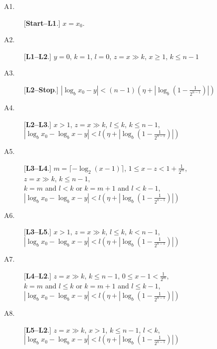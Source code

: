 \documentclass[a4paper,12pt]{article}
\begin{document}
\begin{description}
\item[A1.]
[\textbf{Start--L1}.] $x = x_0$.
\item[A2.]
[\textbf{L1--L2}.] $y=0$, $k=1$, $l=0$, $z = x \gg k$, $x \ge 1$, $k \le n-1$
\item[A3.]
[\textbf{L2--Stop}.] 
$|\log_bx_0-y| < (n-1)\left(\eta + 
\left|\log_b\left(1 - \frac{1}{2^{n-1}}\right)\right|\right)$
\item[A4.]
[\textbf{L2--L3}.]
$x>1$, $z = x \gg k$, $l \le k$, $k \le n-1$,\\
$|\log_bx_0 - \log_b x - y| < l\left(\eta+
\left|\log_b\left(1 - \frac{1}{2^{n-1}}\right)\right|\right)$
\item[A5.]
[\textbf{L3--L4}.]
$m = \lceil-\log_2(x-1)\rceil$, $1 \le x-z < 1+\frac{1}{2^m}$,\\
$z = x \gg k$, $k \le n-1$,\\
$k = m$ and $l < k$ or $k=m+1$ and $l < k-1$,\\
$|\log_bx_0 - \log_b x - y| < l\left(\eta+
\left|\log_b\left(1 - \frac{1}{2^{n-1}}\right)\right|\right)$
\item[A6.]
[\textbf{L3--L5}.]
$x>1$, $z = x \gg k$, $l \le k$, $k < n-1$,\\
$|\log_bx_0 - \log_b x - y| < l\left(\eta+
\left|\log_b\left(1 - \frac{1}{2^{n-1}}\right)\right|\right)$
\item[A7.]
[\textbf{L4--L2}.]
$z = x \gg k$, $k \le n-1$, $0 \le x-1 < \frac{1}{2^m}$,\\
$k = m$ and $l \le k$ or $k = m+1$ and $l \le k-1$,\\
$|\log_bx_0 - \log_b x - y| < l\left(\eta+
\left|\log_b\left(1 - \frac{1}{2^{n-1}}\right)\right|\right)$
\item[A8.]
[\textbf{L5--L2}.]
$z = x \gg k$, $x > 1$, $k \le n-1$, $l < k$,\\
$|\log_bx_0 - \log_b x - y| < l\left(\eta+
\left|\log_b\left(1 - \frac{1}{2^{n-1}}\right)\right|\right)$
\end{description}
\end{document}
